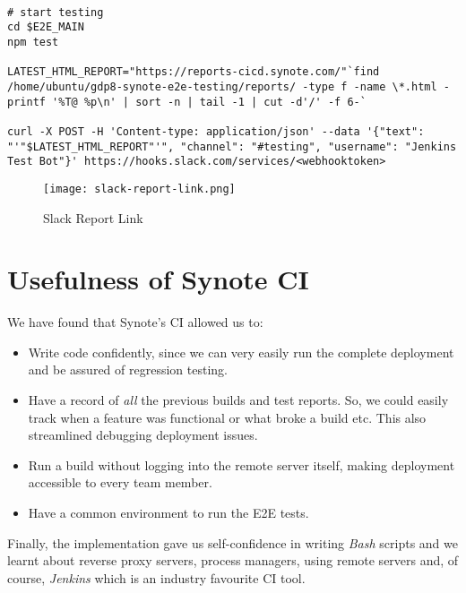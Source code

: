 \begin{listing}[H]
\begin{verbatim}

# start testing
cd $E2E_MAIN
npm test

LATEST_HTML_REPORT="https://reports-cicd.synote.com/"`find /home/ubuntu/gdp8-synote-e2e-testing/reports/ -type f -name \*.html -printf '%T@ %p\n' | sort -n | tail -1 | cut -d'/' -f 6-`

curl -X POST -H 'Content-type: application/json' --data '{"text": "'"$LATEST_HTML_REPORT"'", "channel": "#testing", "username": "Jenkins Test Bot"}' https://hooks.slack.com/services/<webhooktoken>

\end{verbatim}
\label{lst:run-e2e-tests}
\end{listing}

\begin{figure}[!hbt]
  	\centering
 	\texttt{[image: slack-report-link.png]}
  	\caption{Slack Report Link}
 	\label{fig:slack-report-link}
\end{figure}

\vspace{1cm}

\section{Usefulness of Synote CI}
\label{sec:usefulness-of-synote-ci}

We have found that Synote's CI allowed us to:

\begin{itemize}

  \item Write code confidently, since we can very easily run the complete deployment and be assured of regression testing.

  \item Have a record of \textit{all} the previous builds and test reports. So, we could easily track when a feature was functional or what broke a build etc. This also streamlined debugging deployment issues.

  \item Run a build without logging into the remote server itself, making deployment accessible to every team member.

  \item Have a common environment to run the E2E tests.

\end{itemize}

Finally, the implementation gave us self-confidence in writing \textit{Bash} scripts and we learnt about reverse proxy servers, process managers, using remote servers and, of course, \textit{Jenkins} which is an industry favourite CI tool.
